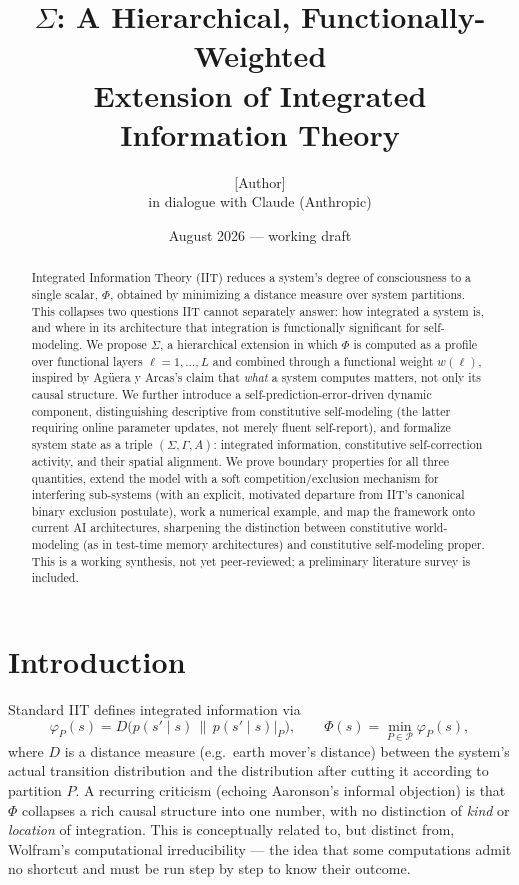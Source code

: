\documentclass[11pt]{article}
\title{\textbf{$\Sigma$: A Hierarchical, Functionally-Weighted\\ Extension of Integrated Information Theory}}
\author{[Author]\\ \small in dialogue with Claude (Anthropic)}
\date{August 2026 --- working draft}
\begin{document}
\maketitle

\begin{abstract}
Integrated Information Theory (IIT) reduces a system's degree of consciousness to a single scalar, $\Phi$, obtained by minimizing a distance measure over system partitions. This collapses two questions IIT cannot separately answer: how integrated a system is, and where in its architecture that integration is functionally significant for self-modeling. We propose $\Sigma$, a hierarchical extension in which $\Phi$ is computed as a profile over functional layers $\ell=1,\dots,L$ and combined through a functional weight $w(\ell)$, inspired by Ag\"uera y Arcas's claim that \emph{what} a system computes matters, not only its causal structure. We further introduce a self-prediction-error-driven dynamic component, distinguishing descriptive from constitutive self-modeling (the latter requiring online parameter updates, not merely fluent self-report), and formalize system state as a triple $(\Sigma,\Gamma,A)$: integrated information, constitutive self-correction activity, and their spatial alignment. We prove boundary properties for all three quantities, extend the model with a soft competition/exclusion mechanism for interfering sub-systems (with an explicit, motivated departure from IIT's canonical binary exclusion postulate), work a numerical example, and map the framework onto current AI architectures, sharpening the distinction between constitutive world-modeling (as in test-time memory architectures) and constitutive self-modeling proper. This is a working synthesis, not yet peer-reviewed; a preliminary literature survey is included.
\end{abstract}

\section{Introduction}

Standard IIT defines integrated information via
\[
\varphi_P(s) = D\big(p(s'\mid s)\,\|\,p(s'\mid s)|_P\big), \qquad \Phi(s) = \min_{P\in\mathcal P}\varphi_P(s),
\]
where $D$ is a distance measure (e.g.\ earth mover's distance) between the system's actual transition distribution and the distribution after cutting it according to partition $P$. A recurring criticism (echoing Aaronson's informal objection) is that $\Phi$ collapses a rich causal structure into one number, with no distinction of \emph{kind} or \emph{location} of integration. This is conceptually related to, but distinct from, Wolfram's computational irreducibility --- the idea that some computations admit no shortcut and must be run step by step to know their outcome.
\end{document}
